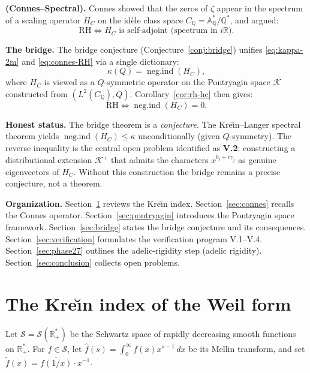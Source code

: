 \documentclass[11pt]{amsart}
\newcommand{\kap}{\kappa}
\newcommand{\negind}{\operatorname{neg.ind}}
\newcommand{\AQ}{\mathbb{A}_{\mathbb{Q}}}
\newcommand{\CQ}{C_{\mathbb{Q}}}
\newcommand{\Kcal}{\mathcal{K}}
\newcommand{\Scal}{\mathcal{S}}
\begin{document}
\medskip
\textbf{(Connes--Spectral).}  Connes \cite{Connes99} showed that the zeros of $\zeta$
appear in the spectrum of a scaling operator $H_C$ on the id\`ele class space
$\CQ = \AQ^*/\mathbb{Q}^*$, and argued:
\begin{equation}\label{eq:connes-RH}
  \mathrm{RH} \iff H_C \text{ is self-adjoint (spectrum in } i\mathbb{R}\text{)}.
\end{equation}

\medskip
\textbf{The bridge.}  The bridge conjecture (Conjecture~\ref{conj:bridge}) unifies
\eqref{eq:kappa-2m} and \eqref{eq:connes-RH} via a single dictionary:
\[
  \kap(Q) = \negind(H_C),
\]
where $H_C$ is viewed as a $Q$-symmetric operator on the Pontryagin space $\Kcal$
constructed from $(L^2(\CQ), Q)$.  Corollary~\ref{cor:rh-hc} then gives:
\[
  \mathrm{RH} \iff \negind(H_C) = 0.
\]

\medskip
\textbf{Honest status.}  The bridge theorem is a \emph{conjecture}.  The Kre\u{\i}n--Langer
spectral theorem \cite{KreinLanger78, AzizovIokhvidov} yields $\negind(H_C) \le \kap$
unconditionally (given $Q$-symmetry).  The reverse inequality is the central open
problem identified as \textbf{V.2}: constructing a distributional extension
$\Kcal^+$ that admits the characters $x^{b_j+i\gamma_j}$ as genuine eigenvectors
of $H_C$.  Without this construction the bridge remains a precise conjecture, not a theorem.

\medskip
\textbf{Organization.}  Section~\ref{sec:krein} reviews the Kre\u{\i}n index.
Section~\ref{sec:connes} recalls the Connes operator.  Section~\ref{sec:pontryagin}
introduces the Pontryagin space framework.  Section~\ref{sec:bridge} states the bridge
conjecture and its consequences.  Section~\ref{sec:verification} formulates the
verification program V.1--V.4.  Section~\ref{sec:phase27} outlines the adelic-rigidity step (adelic
rigidity).  Section~\ref{sec:conclusion} collects open problems.

\section{The Kre\u{\i}n index of the Weil form}
\label{sec:krein}

Let $\Scal = \Scal(\mathbb{R}^*_+)$ be the Schwartz space of rapidly decreasing smooth
functions on $\mathbb{R}^*_+$.  For $f \in \Scal$, let
$\hat f(s) = \int_0^\infty f(x)x^{s-1}\,dx$ be its Mellin transform, and set
$\tilde f(x) = \overline{f(1/x)}\cdot x^{-1}$.
\end{document}
